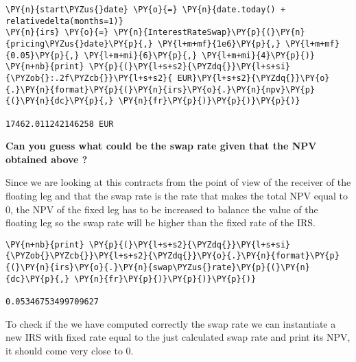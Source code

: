 \begin{tcolorbox}[breakable, size=fbox, boxrule=1pt, pad at break*=1mm,colback=cellbackground, colframe=cellborder]
\begin{Verbatim}[commandchars=\\\{\}]
\PY{n}{start\PYZus{}date} \PY{o}{=} \PY{n}{date.today() + relativedelta(months=1)}
\PY{n}{irs} \PY{o}{=} \PY{n}{InterestRateSwap}\PY{p}{(}\PY{n}{pricing\PYZus{}date}\PY{p}{,} \PY{l+m+mf}{1e6}\PY{p}{,} \PY{l+m+mf}{0.05}\PY{p}{,} \PY{l+m+mi}{6}\PY{p}{,} \PY{l+m+mi}{4}\PY{p}{)}
\PY{n+nb}{print} \PY{p}{(}\PY{l+s+s2}{\PYZdq{}}\PY{l+s+si}{\PYZob{}:.2f\PYZcb{}}\PY{l+s+s2}{ EUR}\PY{l+s+s2}{\PYZdq{}}\PY{o}{.}\PY{n}{format}\PY{p}{(}\PY{n}{irs}\PY{o}{.}\PY{n}{npv}\PY{p}{(}\PY{n}{dc}\PY{p}{,} \PY{n}{fr}\PY{p}{)}\PY{p}{)}\PY{p}{)}

17462.011242146258 EUR
\end{Verbatim}
\end{tcolorbox}

\textbf{Can you guess what could be the \textbf{swap rate} given that the NPV obtained above ?}

Since we are looking at this contracts from the point of view
of the receiver of the floating leg and that the swap rate is the rate that makes the total NPV equal to 0, the NPV of the fixed leg has to be increased to balance the value of the floating leg so the swap rate will be higher than the fixed rate of the IRS.

\begin{tcolorbox}[breakable, size=fbox, boxrule=1pt, pad at break*=1mm,colback=cellbackground, colframe=cellborder]
\begin{Verbatim}[commandchars=\\\{\}]
\PY{n+nb}{print} \PY{p}{(}\PY{l+s+s2}{\PYZdq{}}\PY{l+s+si}{\PYZob{}\PYZcb{}}\PY{l+s+s2}{\PYZdq{}}\PY{o}{.}\PY{n}{format}\PY{p}{(}\PY{n}{irs}\PY{o}{.}\PY{n}{swap\PYZus{}rate}\PY{p}{(}\PY{n}{dc}\PY{p}{,} \PY{n}{fr}\PY{p}{)}\PY{p}{)}\PY{p}{)}

0.05346753499709627
\end{Verbatim}
\end{tcolorbox}
    
To check if the we have computed correctly the swap rate we can
instantiate a new IRS with fixed rate equal to the just calculated swap
rate and print its NPV, it should come very close to 0.

